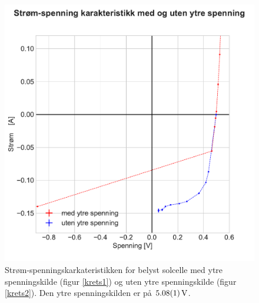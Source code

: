 \documentclass[%
 reprint,
 amsmath,amssymb,
 aps,
 norsk,
 booktabs
]{revtex4-1}
\begin{document}
\begin{figure}
  \centering
  \includegraphics[scale=0.47]{ytre_spenning_sammen.pdf}
  \caption{Strøm-spenningskarkateristikken for belyst solcelle med ytre spenningskilde (figur \vref{krets1}) og uten ytre spenningskilde (figur \vref{krets2}). Den ytre spenningskilden er på $\SI{5.08\pm0.01}{\volt}$.}
  \label{fig_ekstra}
\end{figure}
\end{document}
